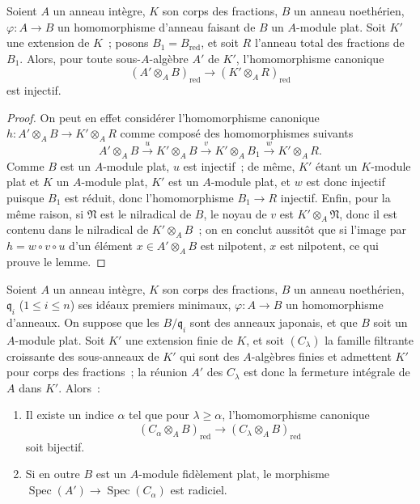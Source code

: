 \begin{lemma}[23.2.3]
\label{0.23.2.3-fr}
Soient $A$ un anneau intègre, $K$ son corps des fractions, $B$ un anneau
noethérien, $\varphi:A\to B$ un homomorphisme d'anneau faisant de $B$ un
$A$-module plat. Soit $K'$ une extension de $K$~; posons
$B_1=B_{\mathrm{red}}$, et soit $R$ l'anneau total des fractions de $B_1$.
Alors, pour toute sous-$A$-algèbre $A'$ de $K'$, l'homomorphisme canonique
\begin{equation}
\label{0.23.1.8.1-fr}
  (A'\otimes_AB)_{\mathrm{red}}
  \longrightarrow(K'\otimes_AR)_{\mathrm{red}}
  \tag{23.1.8.1}
\end{equation}
est injectif.
\end{lemma}

\begin{proof}
On peut en effet considérer l'homomorphisme canonique
$h:A'\otimes_AB\to K'\otimes_AR$ comme composé des homomorphismes suivants
\[
  A'\otimes_AB\xrightarrow{u}K'\otimes_AB
  \xrightarrow{v}K'\otimes_AB_1\xrightarrow{w}K'\otimes_AR.
\]
Comme $B$ est un $A$-module plat, $u$ est injectif~; de même, $K'$ étant un
$K$-module plat et $K$ un $A$-module plat, $K'$ est un $A$-module plat, et
$w$ est donc injectif puisque $B_1$ est réduit, donc l'homomorphisme
$B_1\to R$ injectif. Enfin, pour la même raison, si $\mathfrak N$ est
le nilradical de $B$, le noyau de $v$ est $K'\otimes_A\mathfrak N$, donc il est
contenu dans le nilradical de $K'\otimes_AB$~; on en conclut aussitôt que si
l'image par $h=w\circ v\circ u$ d'un élément $x\in A'\otimes_AB$ est
nilpotent, $x$ est nilpotent, ce qui prouve le lemme.
\end{proof}

\begin{proposition}[23.2.4]
\label{0.23.2.4-fr}
Soient $A$ un anneau intègre, $K$ son corps des fractions, $B$ un anneau
noethérien, $\mathfrak q_i$ ($1\leqslant i\leqslant n$) ses idéaux premiers
minimaux, $\varphi:A\to B$ un homomorphisme d'anneaux. On suppose que les
$B/\mathfrak q_i$ sont des anneaux japonais, et que $B$ soit un $A$-module
plat. Soit $K'$ une extension finie de $K$, et soit $(C_\lambda)$ la famille
filtrante croissante des sous-anneaux de $K'$ qui sont des $A$-algèbres
finies et admettent $K'$ pour corps des fractions~; la réunion $A'$ des
$C_\lambda$ est donc la fermeture intégrale de $A$ dans $K'$. Alors~:
\begin{enumerate}
  \item[\textup{(i)}] Il existe un indice $\alpha$ tel que pour $\lambda\geqslant
  \alpha$, l'homomorphisme canonique
  \begin{equation}
  \label{0.23.2.4.1-fr}
    (C_\alpha\otimes_AB)_{\mathrm{red}}
    \longrightarrow(C_\lambda\otimes_AB)_{\mathrm{red}}
    \tag{23.2.4.1}
  \end{equation}
  soit bijectif.
  \item[\textup{(ii)}] Si en outre $B$ est un $A$-module fidèlement plat, le morphisme
  $\operatorname{Spec}(A')\to\operatorname{Spec}(C_\alpha)$ est radiciel.
\end{enumerate}
\end{proposition}

